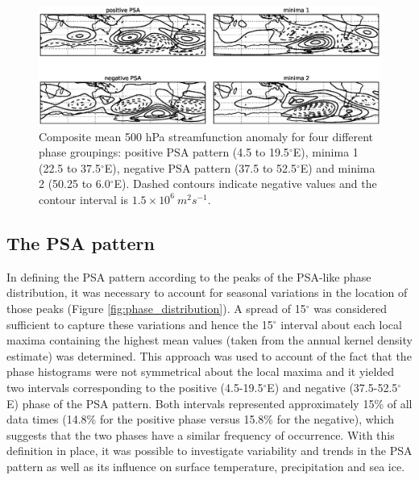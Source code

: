 \begin{figure}
\begin{center}
\includegraphics[width=1\columnwidth]{figures/psa/psa-phase-composites_wave6_ERAInterim_500hPa-lat10S10Nmean-lon115E235Ezeropad_030day-runmean-anom-wrt-all_native-np20N260E.eps}
\caption{\label{fig:sf_composites}
Composite mean 500 hPa streamfunction anomaly for four different phase groupings: positive PSA pattern (4.5 to 19.5$^{\circ}$E), minima 1 (22.5 to 37.5$^{\circ}$E), negative PSA pattern (37.5 to 52.5$^{\circ}$E) and minima 2 (50.25 to 6.0$^{\circ}$E). Dashed contours indicate negative values and the contour interval is $1.5 \times 10^6 \: m^2 s^{-1}$.%
}
\end{center}
\end{figure}


\subsection{The PSA pattern}\label{s:psa_results}

In defining the PSA pattern according to the peaks of the PSA-like phase distribution, it was necessary to account for seasonal variations in the location of those peaks (Figure \ref{fig:phase_distribution}). A spread of 15$^{\circ}$ was considered sufficient to capture these variations and hence the 15$^{\circ}$ interval about each local maxima containing the highest mean values (taken from the annual kernel density estimate) was determined. This approach was used to account of the fact that the phase histograms were not symmetrical about the local maxima and it yielded two intervals corresponding to the positive (4.5-19.5$^{\circ}$E) and negative (37.5-52.5$^{\circ}$E) phase of the PSA pattern. Both intervals represented approximately 15\% of all data times (14.8\% for the positive phase versus 15.8\% for the negative), which suggests that the two phases have a similar frequency of occurrence. With this definition in place, it was possible to investigate variability and trends in the PSA pattern as well as its influence on surface temperature, precipitation and sea ice. 

